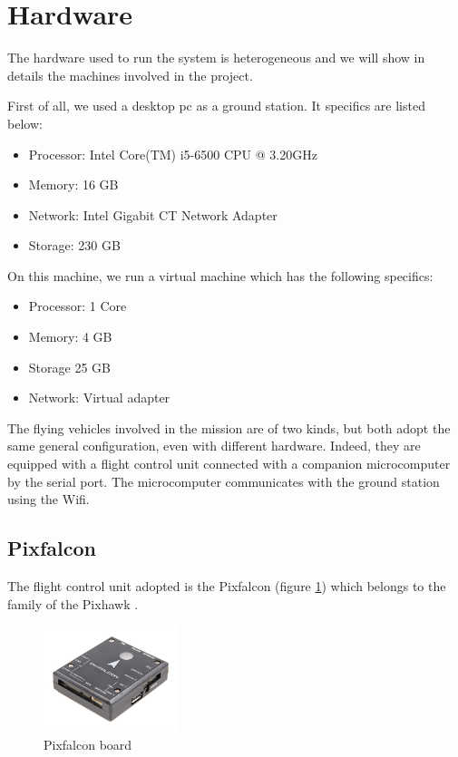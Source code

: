 \section{Hardware}

The hardware used to run the system is heterogeneous and we will show in details
the machines involved in the project.

First of all, we used a desktop pc as a ground station. It specifics are listed below:
\begin{itemize}
  \item Processor: Intel Core(TM) i5-6500 CPU @ 3.20GHz
  \item Memory: 16 GB
  \item Network: Intel Gigabit CT Network Adapter
  \item Storage: 230 GB
\end{itemize}

On this machine, we run a virtual machine which has the following specifics:
\begin{itemize}
  \item Processor: 1 Core
  \item Memory: 4 GB
  \item Storage 25 GB
  \item Network: Virtual adapter
\end{itemize}

The flying vehicles involved in the mission are of two kinds, but both adopt the
same general configuration, even with different hardware. Indeed, they are equipped
with a flight control unit connected with a companion microcomputer by the serial port.
The microcomputer communicates with the ground station using the Wifi.

\subsection{Pixfalcon}
The flight control unit adopted is the Pixfalcon (figure \ref{fig:hardware_pixfalcon})
which belongs to the family of the Pixhawk \cite{pixhawk}.

\begin{figure}[h]
\centering
\includegraphics[width=0.35\textwidth]{chapters/chapter-03/figures/hardware_pixfalcon.png}
\caption{Pixfalcon board}
\label{fig:hardware_pixfalcon}
\end{figure}

